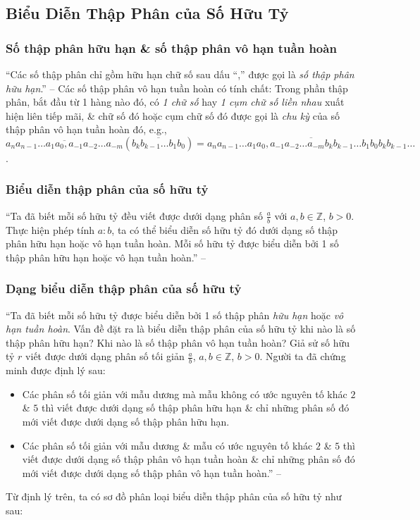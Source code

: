 \documentclass{article}
\numberwithin{equation}{section}
\begin{document}
\subsection{Biểu Diễn Thập Phân của Số Hữu Tỷ}

\subsubsection{Số thập phân hữu hạn \& số thập phân vô hạn tuần hoàn}
``Các số thập phân chỉ gồm hữu hạn chữ số sau dấu ``,'' được gọi là \textit{số thập phân hữu hạn}.'' -- \cite[p. 27]{SGK_Toan_7_Canh_Dieu_tap_1} Các số thập phân vô hạn tuần hoàn có tính chất: Trong phần thập phân, bắt đầu từ 1 hàng nào đó, có \textit{1 chữ số} hay \textit{1 cụm chữ số liền nhau} xuất hiện liên tiếp mãi, \& chữ số đó hoặc cụm chữ số đó được gọi là \textit{chu kỳ} của số thập phân vô hạn tuần hoàn đó, e.g., $\overline{a_na_{n-1}\ldots a_1a_0,a_{-1}a_{-2}\ldots a_{-m}}(\overline{b_kb_{k-1}\ldots b_1b_0}) = \overline{a_na_{n-1}\ldots a_1a_0,a_{-1}a_{-2}\ldots a_{-m}b_kb_{k-1}\ldots b_1b_0b_kb_{k-1}\ldots}$.

\subsubsection{Biểu diễn thập phân của số hữu tỷ}
``Ta đã biết mỗi số hữu tỷ đều viết được dưới dạng phân số $\frac{a}{b}$ với $a,b\in\mathbb{Z}$, $b > 0$. Thực hiện phép tính $a:b$, ta có thể biểu diễn số hữu tỷ đó dưới dạng số thập phân hữu hạn hoặc vô hạn tuần hoàn. Mỗi số hữu tỷ được biểu diễn bởi 1 số thập phân hữu hạn hoặc vô hạn tuần hoàn.'' -- \cite[p. 28]{SGK_Toan_7_Canh_Dieu_tap_1}

\subsubsection{Dạng biểu diễn thập phân của số hữu tỷ}
``Ta đã biết mỗi số hữu tỷ được biểu diễn bởi 1 số thập phân \textit{hữu hạn} hoặc \textit{vô hạn tuần hoàn}. Vấn đề đặt ra là biểu diễn thập phân của số hữu tỷ khi nào là số thập phân hữu hạn? Khi nào là số thập phân vô hạn tuần hoàn? Giả sử số hữu tỷ $r$ viết được dưới dạng phân số tối giản $\frac{a}{b}$, $a,b\in\mathbb{Z}$, $b> 0$. Người ta đã chứng minh được định lý sau:
\begin{itemize}
	\item Các phân số tối giản với mẫu dương mà mẫu không có ước nguyên tố khác $2$ \& $5$ thì viết được dưới dạng số thập phân hữu hạn \& chỉ những phân số đó mới viết được dưới dạng số thập phân hữu hạn.
	\item Các phân số tối giản với mẫu dương \& mẫu có ước nguyên tố khác $2$ \& $5$ thì viết được dưới dạng số thập phân vô hạn tuần hoàn \& chỉ những phân số đó mới viết được dưới dạng số thập phân vô hạn tuần hoàn.'' -- \cite[p. 29]{SGK_Toan_7_Canh_Dieu_tap_1}
\end{itemize}
Từ định lý trên, ta có sơ đồ phân loại biểu diễn thập phân của số hữu tỷ như sau:
\end{document}
